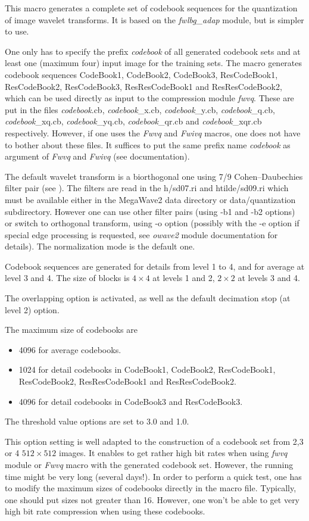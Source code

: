 This macro generates a complete set of codebook sequences for the quantization 
of image wavelet transforms. 
It is based on the {\em fwlbg\_adap} module, but is simpler to use. 

One only has to specify the prefix {\em codebook} of all generated 
codebook sets and at least one (maximum four) input image for the 
training sets. The macro generates codebook sequences 
CodeBook1, CodeBook2, CodeBook3, ResCodeBook1, ResCodeBook2, ResCodeBook3, 
ResResCodeBook1 and ResResCodeBook2, which can be used directly 
as input to the compression module {\em fwvq}. These are put in the files 
{\em codebook}.cb, {\em codebook}\_x.cb, {\em codebook}\_y.cb, 
{\em codebook}\_q.cb, {\em codebook}\_xq.cb, {\em codebook}\_yq.cb, 
{\em codebook}\_qr.cb and {\em codebook}\_xqr.cb respectively. 
However, if one uses the {\em Fwvq} and {\em Fwivq} macros, 
one does not have to bother about these files. It suffices to put 
the same prefix name {\em codebook} as argument of 
{\em Fwvq} and {\em Fwivq} (see documentation). 

The default wavelet transform is a biorthogonal one using 
7/9 Cohen--Daubechies filter pair (see \cite{cohen.daubechies.ea:biorthogonal}). 
The filters are read in the h/sd07.ri and htilde/sd09.ri 
which must be available either in the MegaWave2 data directory or 
data/quantization subdirectory. 
However one can use other filter pairs (using -b1 and -b2 options) 
or switch to orthogonal transform, using -o option 
(possibly with the -e option if special edge processing is requested, 
see {\em owave2} module documentation for details). 
The normalization mode is the default one. 

Codebook sequences are generated for details from level 1 to 4, and 
for average at level 3 and 4. The size of blocks is $4\times 4$ at 
levels 1 and 2, $2\times 2$ at levels 3 and 4.

The overlapping option is activated, as well as the default decimation 
stop (at level 2) option. 

The maximum size of codebooks are 
\begin{itemize} 
\item 4096 for average codebooks. 
\item 1024 for detail codebooks in CodeBook1, CodeBook2, ResCodeBook1, 
ResCodeBook2, ResResCodeBook1 and ResResCodeBook2.
\item 4096 for detail codebooks in CodeBook3 and ResCodeBook3.
\end{itemize}

The threshold value options are set to 3.0 and 1.0. 

This option setting is well adapted to the construction of a codebook set 
from 2,3 or 4 $512\times 512$ images. It enables to get rather high bit rates 
when using {\em fwvq} module or {\em Fwvq} macro with the generated codebook 
set. However, the running time might be very long (several days!). 
In order to perform a quick test, one has to modify the maximum sizes 
of codebooks directly in the macro file. Typically, one should put 
sizes not greater than 16. However, one won't be able to get 
very high bit rate compression when using these codebooks.

